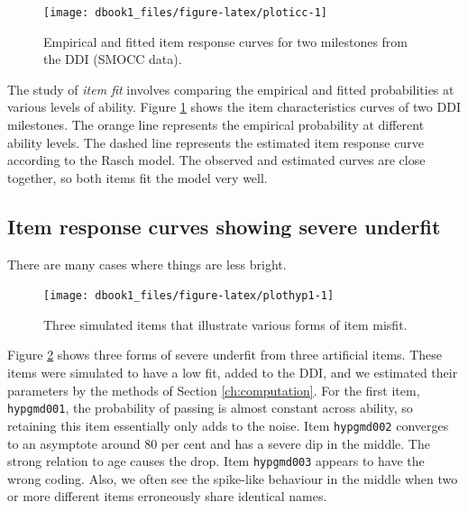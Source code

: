\documentclass[
]{book}
\begin{document}
\begin{figure}

{\centering \texttt{[image: dbook1\_files/figure-latex/ploticc-1]} 

}

\caption{Empirical and fitted item response curves for two milestones from the DDI (SMOCC data).}\label{fig:ploticc}
\end{figure}



The study of \emph{item fit} involves comparing the empirical and fitted probabilities at various levels of ability. Figure \ref{fig:ploticc} shows the item characteristics curves of two DDI milestones. The orange line represents the empirical probability at different ability levels. The dashed line represents the estimated item response curve according to the Rasch model. The observed and estimated curves are close together, so both items fit the model very well.

\hypertarget{item-response-curves-showing-severe-underfit}{%
\subsection{Item response curves showing severe underfit}\label{item-response-curves-showing-severe-underfit}}

There are many cases where things are less bright.

\begin{figure}

{\centering \texttt{[image: dbook1\_files/figure-latex/plothyp1-1]} 

}

\caption{Three simulated items that illustrate various forms of item misfit.}\label{fig:plothyp1}
\end{figure}



Figure \ref{fig:plothyp1} shows three forms of severe underfit from three artificial items. These items were simulated to have a low fit, added to the DDI, and we estimated their parameters by the methods of Section \ref{ch:computation}. For the first item, \texttt{hypgmd001}, the probability of passing is almost constant across ability, so retaining this item essentially only adds to the noise. Item \texttt{hypgmd002} converges to an asymptote around 80 per cent and has a severe dip in the middle. The strong relation to age causes the drop. Item \texttt{hypgmd003} appears to have the wrong coding. Also, we often see the spike-like behaviour in the middle when two or more different items erroneously share identical names.
\end{document}
